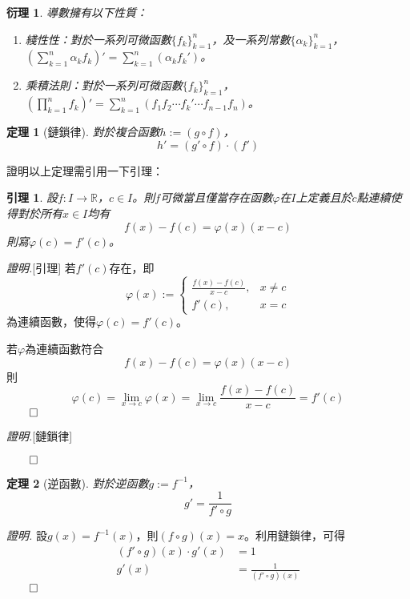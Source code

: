 \documentclass[12pt]{article}
\newtheorem*{theorem}{定理}
\newtheorem*{corollary}{衍理}
\newtheorem*{lemma}{引理}
\renewenvironment*{proof}{\textit{證明.}}{\hfill$\qed$}
\begin{document}
    \begin{corollary}
        導數擁有以下性質：\begin{enumerate}
            \item 綫性性：對於一系列可微函數$\{f_k\}_{k=1}^n$，及一系列常數$\{\alpha_k\}_{k=1}^n$，$\displaystyle(\sum_{k=1}^{n}\alpha_k f_k)'=\sum_{k=1}^{n}(\alpha_k f_k')$。
            \item 乘積法則：對於一系列可微函數$\{f_k\}_{k=1}^n$，$\displaystyle(\prod_{k=1}^{n}f_k)'=\sum_{k=1}^{n}(f_1f_2\cdots f_k'\cdots f_{n-1}f_n)$。
        \end{enumerate}
    \end{corollary}

    \begin{theorem}[鏈鎖律]
        對於複合函數$h:=(g\circ f)$，$$h'=(g'\circ f)\cdot(f')$$
    \end{theorem}

    證明以上定理需引用一下引理：

    \begin{lemma}
        設$f:I\to\mathbb{R}$，$c\in I$。則$f$可微當且僅當存在函數$\varphi$在$I$上定義且於$c$點連續使得對於所有$x\in I$均有$$f(x)-f(c)=\varphi(x)(x-c)$$則寫$\varphi(c)=f'(c)$。
    \end{lemma}

    \begin{proof}[引理]
        若$f'(c)$存在，即$$\varphi(x):=\begin{cases}
            \frac{f(x)-f(c)}{x-c}, & x\neq c\\
            f'(c), & x=c
        \end{cases}$$為連續函數，使得$\varphi(c)=f'(c)$。

        若$\varphi$為連續函數符合$$f(x)-f(c)=\varphi(x)(x-c)$$則$$\varphi(c)=\lim_{x\to c}\varphi(x)=\lim_{x\to c}\frac{f(x)-f(c)}{x-c}=f'(c)$$
    \end{proof}

    \begin{proof}[鏈鎖律]
        
    \end{proof}

    \begin{theorem}[逆函數]
        對於逆函數$g:=f^{-1}$，$$g'=\frac{1}{f'\circ g}$$
    \end{theorem}

    \begin{proof}
        設$g(x)=f^{-1}(x)$，則$(f\circ g)(x)=x$。利用鏈鎖律，可得\begin{align*}
            (f'\circ g)(x)\cdot g'(x)&=1\\
            g'(x)&=\frac{1}{(f'\circ g)(x)}
        \end{align*}
    \end{proof}
\end{document}
